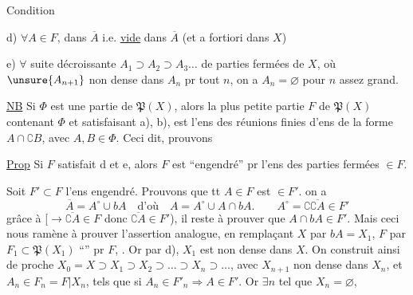
Condition

d) $\forall A\in F$,   dans $\overline A$  i.e.     \uline{vide} dans $\overline A$ (et a fortiori dans $X$)

e)  $\forall$ suite décroissante $A_1\supset A_2\supset A_3\ldots$ de parties fermées  de $X$, où $\unsure{A_{n+1}}$ non dense dans $A_n$ pr tout $n$, on a $A_n=\varnothing$ pour $n$ assez grand.

\uline{NB} Si $\Phi$ est une partie de $\mathfrak P(X)$, alors la plus petite partie $F$ de $\mathfrak P(X)$ contenant $\Phi$ et satisfaisant a), b), est l'ens des  réunions finies d'ens de la forme $A\cap\complement B$, avec $A,B\in\Phi$. Ceci dit, prouvons

\uline{Prop} Si $F$ satisfait d et e, alors $F$ est ``engendré'' pr l'ens des parties fermées $\in F$.

Soit $F'\subset F$ l'ens engendré.  Prouvons que tt $A\in F$ est $\in F'$.  on a
\[
\overline A=A^\circ\cup bA\quad\text{d'où}\quad A=A^\circ\cup A\cap bA.\qquad A^\circ=\complement\overline{\complement A}\in F'
\]
grâce à  [$\to\overline{\complement A}\in F$ donc $\overline{\complement A}\in F'$), il reste à prouver que $A\cap bA\in F'$. Mais ceci nous  ramène à prouver l'assertion analogue, en remplaçant $X$ par $bA=X_1$, $F$  par $F_1\subset\mathfrak P(X_1)$ ``'' pr $F$, . Or par d), $X_1$ est non dense dans $X$. On construit ainsi de proche  $X_0=X\supset X_1\supset X_2\supset\ldots\supset X_n\supset\ldots$, avec $X_{n+1}$ non dense dans $X_n$, et $A_n\in F_n=F|X_n$, tels que si $A_n\in F'_n\Rightarrow A\in F'$. Or $\exists n$ tel que $X_n=\varnothing$, 


